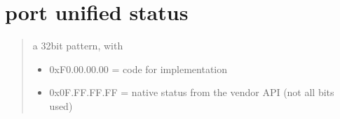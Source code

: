 \documentclass[a4paper,10pt,english]{sphinxmanual}
\begin{document}
\section{port unified status}
\label{\detokenize{canports:port-unified-status}}\begin{quote}

\sphinxAtStartPar
a 32\sphinxhyphen{}bit pattern, with
\begin{itemize}
\item {} 
\sphinxAtStartPar
0xF0.00.00.00 = code for implementation

\item {} 
\sphinxAtStartPar
0x0F.FF.FF.FF = native status from the vendor API (not all bits used)

\end{itemize}
\end{quote}
\end{document}
